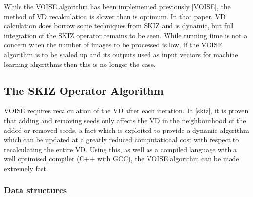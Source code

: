 \documentclass[12pt, report, a4paper, titlepage]{article}
\numberwithin{equation}{section}
\newcommand*{\citen}{}%
\DeclareRobustCommand*{\citen}[1]{%
  \begingroup
    \romannumeral-`\x %
    \setcitestyle{numbers}%
    \cite{#1}%
  \endgroup
}
\begin{document}
While the VOISE algorithm has been implemented previously [\citen{VOISE}], the method of VD recalculation is slower than is optimum. In that paper, VD calculation does borrow some techniques from SKIZ and is dynamic, but full integration of the SKIZ operator remains to be seen. While running time is not a concern when the number of images to be processed is low, if the VOISE algorithm is to be scaled up and its outputs used as input vectors for machine learning algorithms then this is no longer the case.

\subsection{The SKIZ Operator Algorithm}

VOISE requires recalculation of the VD after each iteration. In [\citen{skiz}], it is proven that adding and removing seeds only affects the VD in the neighbourhood of the added or removed seeds, a fact which is exploited to provide a dynamic algorithm which can be updated at a greatly reduced computational cost with respect to recalculating the entire VD. Using this, as well as a compiled language with a well optimised compiler (C++ with GCC), the VOISE algorithm can be made extremely fast.

\subsubsection{Data structures}
\end{document}
